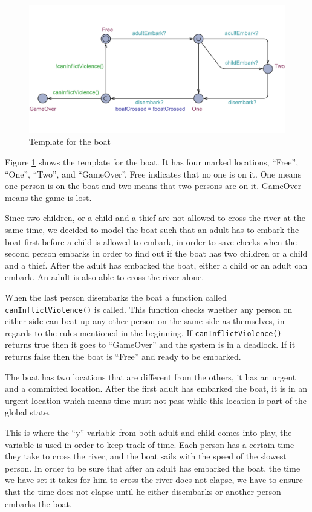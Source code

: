 \documentclass[a4paper,12pt]{article}
\begin{document}
\begin{figure}[H]
\centering
\includegraphics[width=\linewidth]{Boat.pdf}
\caption{Template for the boat}
\label{fig:boat}
\end{figure}

Figure \ref{fig:boat} shows the template for the boat. It has four marked locations, ``Free'', ``One'', ``Two'', and ``GameOver''. Free indicates that no one is on it. One means one person is on the boat and two means that two persons are on it. GameOver means the game is lost. 

Since two children, or a child and a thief are not allowed to cross the river at the same time, we decided to model the boat such that an adult has to embark the boat first before a child is allowed to embark, in order to save checks when the second person embarks in order to find out if the boat has two children or a child and a thief. After the adult has embarked the boat, either a child or an adult can embark. An adult is also able to cross the river alone. 

When the last person disembarks the boat a function called \linebreak \lstinline|canInflictViolence()| is called. This function checks whether any person on either side can beat up any other person on the same side as themselves, in regards to the rules mentioned in the beginning. If \lstinline|canInflictViolence()| returns true then it goes to ``GameOver'' and the system is in a deadlock. If it returns false then the boat is ``Free'' and ready to be embarked.

The boat has two locations that are different from the others, it has an urgent and a committed location. After the first adult has embarked the boat, it is in an urgent location which means time must not pass while this location is part of the global state. 

This is where the ``y'' variable from both adult and child comes into play, the variable is used in order to keep track of time. Each person has a certain time they take to cross the river, and the boat sails with the speed of the slowest person. In order to be sure that after an adult has embarked the boat, the time we have set it takes for him to cross the river does not elapse, we have to ensure that the time does not elapse until he either disembarks or another person embarks the boat.
\end{document}

